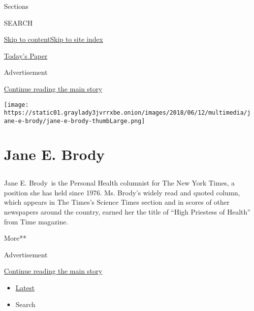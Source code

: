 Sections

SEARCH

\protect\hyperlink{site-content}{Skip to
content}\protect\hyperlink{site-index}{Skip to site index}

\href{https://myaccount.nytimes3xbfgragh.onion/auth/login?response_type=cookie\&client_id=vi}{}

\href{https://www.nytimes3xbfgragh.onion/section/todayspaper}{Today's
Paper}

Advertisement

\protect\hyperlink{after-top}{Continue reading the main story}

\texttt{[image: https://static01.graylady3jvrrxbe.onion/images/2018/06/12/multimedia/jane-e-brody/jane-e-brody-thumbLarge.png]}

\hypertarget{jane-e-brody}{%
\section{Jane E. Brody}\label{jane-e-brody}}

\subsection{}

Jane E. Brody~is the Personal Health columnist for The New York Times, a
position she has held since 1976. Ms. Brody's widely read and quoted
column, which appears in The Times's Science Times section and in scores
of other newspapers around the country, earned her the title of ``High
Priestess of Health'' from Time magazine.

More**

Advertisement

\protect\hyperlink{after-mid1}{Continue reading the main story}

\begin{itemize}
\tightlist
\item
  \protect\hyperlink{stream-panel}{Latest}
\item
  Search
\end{itemize}

